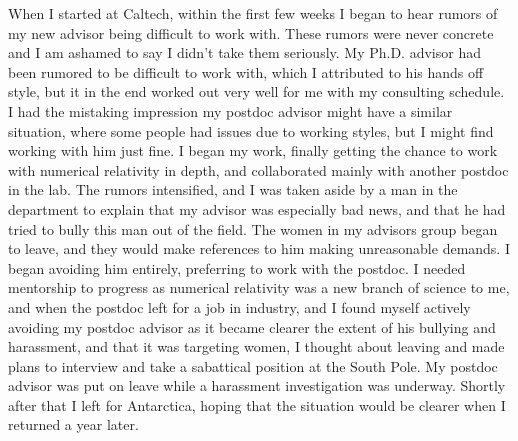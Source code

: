 \documentclass[utf8]{frontiersSCNS} %
\begin{document}
When I started at Caltech, within the first few weeks I began to hear rumors of my new advisor being difficult to work with. These rumors were never concrete and I am ashamed to say I didn't take them seriously. My Ph.D. advisor had been rumored to be difficult to work with, which I attributed to his hands off style, but it in the end worked out very well for me with my consulting schedule. I had the mistaking impression my postdoc advisor might have a similar situation, where some people had issues due to working styles, but I might find working with him just fine. I began my work, finally getting the chance to work with numerical relativity in depth, and collaborated mainly with another postdoc in the lab. The rumors intensified, and I was taken aside by a man in the department to explain that my advisor was especially bad news, and that he had tried to bully this man out of the field. The women in my advisors group began to leave, and they would make references to him making unreasonable demands. I began avoiding him entirely, preferring to work with the postdoc. I needed mentorship to progress as numerical relativity was a new branch of science to me, and when the postdoc left for a job in industry, and I found myself actively avoiding my postdoc advisor as it became clearer the extent of his bullying and harassment, and that it was targeting women, I thought about leaving and made plans to interview and take a sabattical position at the South Pole. My postdoc advisor was put on leave while a harassment investigation was underway. Shortly after that I left for Antarctica, hoping that the situation would be clearer when I returned a year later.
\end{document}

